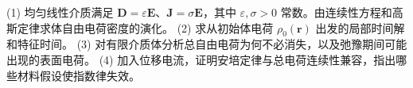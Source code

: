 (1) 均匀线性介质满足 \(\boldsymbol D=\varepsilon\boldsymbol E\)、\(\boldsymbol J=\sigma\boldsymbol E\)，其中 \(\varepsilon,\sigma>0\) 常数。由连续性方程和高斯定律求体自由电荷密度的演化。
(2) 求从初始体电荷 \(\rho_0(\boldsymbol r)\) 出发的局部时间解和特征时间。
(3) 对有限介质体分析总自由电荷为何不必消失，以及弛豫期间可能出现的表面电荷。
(4) 加入位移电流，证明安培定律与总电荷连续性兼容，指出哪些材料假设使指数律失效。

